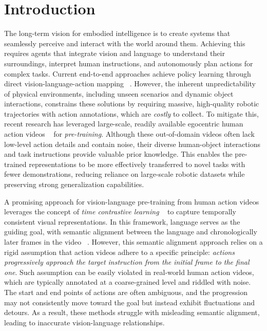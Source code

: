 \section{Introduction}
The long-term vision for embodied intelligence \cite{DBLP:conf/nips/MuZHWDJWDQL23,DBLP:journals/corr/abs-2407-06886} is to create systems that seamlessly perceive and interact with the world around them. Achieving this requires agents that integrate vision and language to understand their surroundings, interpret human instructions, and autonomously plan actions for complex tasks. Current end-to-end approaches achieve policy learning through direct vision-language-action mapping ~\cite{corl23-rt2,corr24-gr2,corr24-openvla}. However, the inherent unpredictability of physical environments, including unseen scenarios and dynamic object interactions, constrains these solutions by requiring massive, high-quality robotic trajectories with action annotations, which are \textit{costly} to collect. To mitigate this, recent research has leveraged large-scale, readily available egocentric human action videos ~\cite{DBLP:conf/iccv/GoyalKMMWKHFYMH17,corr18-epickitchen,cvpr22-ego4d} for \textit{pre-training}. Although these out-of-domain videos often lack low-level action details and contain noise, their diverse human-object interactions and task instructions provide valuable prior knowledge. This enables the pre-trained representations to be more effectively transferred to novel tasks with fewer demonstrations, reducing reliance on large-scale robotic datasets while preserving strong generalization capabilities.

A promising approach for vision-language pre-training from human action videos leverages the concept of \textit{time contrastive learning} ~\cite{icra18-tcn} to capture temporally consistent visual representations. In this framework, language serves as the guiding goal, with semantic alignment between the language and chronologically later frames in the video ~\cite{corl22-r3m,icml23-liv,icml24-decisionnce}. However, this semantic alignment approach relies on a rigid assumption that action videos adhere to a specific principle: \textit{actions progressively approach the target instruction from the initial frame to the final one}. Such assumption can be easily violated in real-world human action videos, which are typically annotated at a coarse-grained level and riddled with noise. The start and end points of actions are often ambiguous, and the progression may not consistently move toward the goal but instead exhibit fluctuations and detours. As a result, these methods struggle with misleading semantic alignment, leading to inaccurate vision-language relationships.

